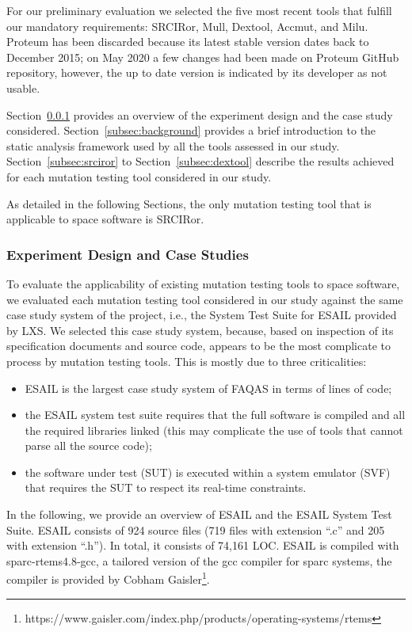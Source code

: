 For our preliminary evaluation we selected the five most recent tools that fulfill our mandatory requirements: SRCIRor, Mull, Dextool, Accmut, and Milu. Proteum has been discarded because its latest stable version dates back to December 2015; on May 2020 a few changes had been made on Proteum GitHub repository, however, the up to date version is indicated by its developer as not usable.

Section~\ref{subsec:experiment_design} provides an overview of the experiment design and the case study considered.
Section~\ref{subsec:background} provides a brief introduction to the static analysis framework used by all the tools assessed in our study.
Section~\ref{subsec:srciror} to Section~\ref{subsec:dextool} describe the results achieved for each mutation testing tool considered in our study.

As detailed in the following Sections, the only mutation testing tool that is applicable to space software is SRCIRor.

\subsubsection{Experiment Design and Case Studies}
\label{subsec:experiment_design}




To evaluate the applicability of existing mutation testing tools to space software, we evaluated each mutation testing tool considered in our study against the same case study system of the project, i.e., the System Test Suite for ESAIL provided by LXS. We selected this case study system, because, based on inspection of its specification documents and source code, appears to be the most complicate to process by mutation testing tools. This is mostly due to three criticalities:

\begin{itemize}
	\item ESAIL is the largest case study system of FAQAS in terms of lines of code;
	\item the ESAIL system test suite requires that the full software is compiled and all the required libraries linked (this may complicate the use of tools that cannot parse all the source code);
	\item the software under test (SUT) is executed within a system emulator (SVF) that requires the SUT to respect its real-time constraints.
\end{itemize}

In the following, we provide an overview of ESAIL and the ESAIL System Test Suite. ESAIL consists of 924 source files (719 files with extension ``.c'' and 205 with extension ``.h''). In total, it consists of 74,161 LOC. ESAIL is compiled with sparc-rtems4.8-gcc, a tailored version of the gcc compiler for sparc systems, the compiler is provided by Cobham Gaisler\footnote{https://www.gaisler.com/index.php/products/operating-systems/rtems}.


